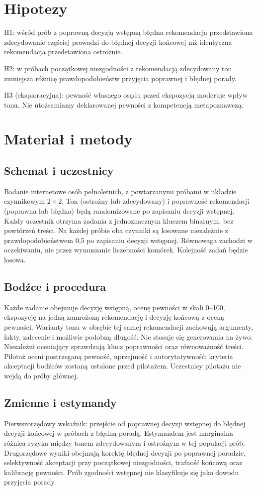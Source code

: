 \documentclass[11pt,a4paper]{article}
\begin{document}
\section{Hipotezy}
H1: wśród prób z poprawną decyzją wstępną błędna rekomendacja przedstawiona zdecydowanie częściej prowadzi do błędnej decyzji końcowej niż identyczna rekomendacja przedstawiona ostrożnie.

H2: w próbach początkowej niezgodności z rekomendacją zdecydowany ton zmniejsza różnicę prawdopodobieństw przyjęcia poprawnej i błędnej porady.

H3 (eksploracyjna): pewność własnego osądu przed ekspozycją moderuje wpływ tonu. Nie utożsamiamy deklarowanej pewności z kompetencją metapoznawczą.
\section{Materiał i metody}
\subsection{Schemat i uczestnicy}
Badanie internetowe osób pełnoletnich, z powtarzanymi próbami w układzie czynnikowym $2\times2$. Ton (ostrożny lub zdecydowany) i poprawność rekomendacji (poprawna lub błędna) będą randomizowane po zapisaniu decyzji wstępnej. Każdy uczestnik otrzyma zadania z jednoznacznym kluczem binarnym, bez powtórzeń treści. Na każdej próbie oba czynniki są losowane niezależnie z prawdopodobieństwem 0,5 po zapisaniu decyzji wstępnej. Równowaga zachodzi w oczekiwaniu, nie przez wymuszanie liczebności komórek. Kolejność zadań będzie losowa.
\subsection{Bodźce i procedura}
Każde zadanie obejmuje decyzję wstępną, ocenę pewności w skali 0--100, ekspozycję na jedną zamrożoną rekomendację i decyzję końcową z oceną pewności. Warianty tonu w obrębie tej samej rekomendacji zachowują argumenty, fakty, zalecenie i możliwie podobną długość. Nie stosuje się generowania na żywo. Niezależni oceniający sprawdzają klucz poprawności oraz równoważność treści. Pilotaż oceni postrzeganą pewność, uprzejmość i autorytatywność; kryteria akceptacji bodźców zostaną ustalone przed pilotażem. Uczestnicy pilotażu nie wejdą do próby głównej.
\subsection{Zmienne i estymandy}
Pierwszorzędowy wskaźnik: przejście od poprawnej decyzji wstępnej do błędnej decyzji końcowej w próbach z błędną poradą. Estymandem jest marginalna różnica ryzyka między tonem zdecydowanym i ostrożnym w tej populacji prób. Drugorzędowe wyniki obejmują korektę błędnej decyzji po poprawnej poradzie, selektywność akceptacji przy początkowej niezgodności, trafność końcową oraz kalibrację pewności. Prób zgodności wstępnej nie klasyfikuje się jako dowodu przyjęcia porady.
\end{document}
